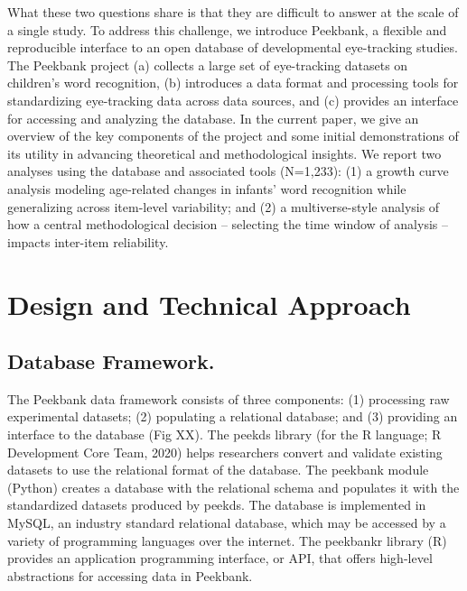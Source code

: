 \documentclass[
  english,
  man]{apa6}
\begin{document}
What these two questions share is that they are difficult to answer at the scale of a single study. To address this challenge, we introduce Peekbank, a flexible and reproducible interface to an open database of developmental eye-tracking studies. The Peekbank project (a) collects a large set of eye-tracking datasets on children's word recognition, (b) introduces a data format and processing tools for standardizing eye-tracking data across data sources, and (c) provides an interface for accessing and analyzing the database. In the current paper, we give an overview of the key components of the project and some initial demonstrations of its utility in advancing theoretical and methodological insights. We report two analyses using the database and associated tools (N=1,233): (1) a growth curve analysis modeling age-related changes in infants' word recognition while generalizing across item-level variability; and (2) a multiverse-style analysis of how a central methodological decision -- selecting the time window of analysis -- impacts inter-item reliability.

\hypertarget{design-and-technical-approach}{%
\section{Design and Technical Approach}\label{design-and-technical-approach}}

\hypertarget{database-framework.}{%
\subsection{Database Framework.}\label{database-framework.}}

The Peekbank data framework consists of three components: (1) processing raw experimental datasets; (2) populating a relational database; and (3) providing an interface to the database (Fig XX). The peekds library (for the R language; R Development Core Team, 2020) helps researchers convert and validate existing datasets to use the relational format of the database. The peekbank module (Python) creates a database with the relational schema and populates it with the standardized datasets produced by peekds. The database is implemented in MySQL, an industry standard relational database, which may be accessed by a variety of programming languages over the internet. The peekbankr library (R) provides an application programming interface, or API, that offers high-level abstractions for accessing data in Peekbank.
\end{document}
